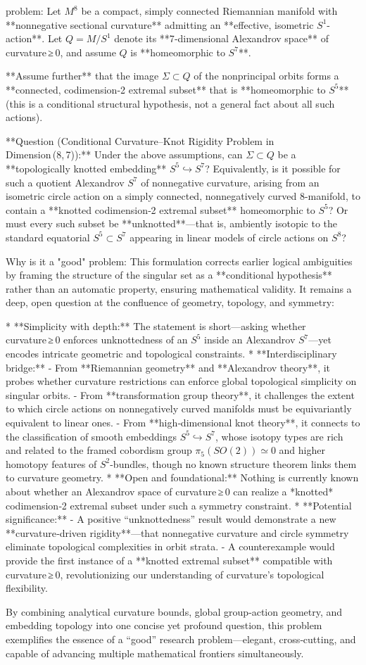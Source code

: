 problem:  
Let \( M^8 \) be a compact, simply connected Riemannian manifold with **nonnegative sectional curvature** admitting an **effective, isometric \( S^1 \)-action**.  
Let \( Q = M / S^1 \) denote its **7‑dimensional Alexandrov space** of curvature ≥ 0, and assume \( Q \) is **homeomorphic to \( S^7 \)**.  

**Assume further** that the image \( \Sigma \subset Q \) of the nonprincipal orbits forms a **connected, codimension‑2 extremal subset** that is **homeomorphic to \( S^5 \)** (this is a conditional structural hypothesis, not a general fact about all such actions).

**Question (Conditional Curvature–Knot Rigidity Problem in Dimension (8, 7)):**  
Under the above assumptions, can \( \Sigma \subset Q \) be a **topologically knotted embedding** \( S^5 \hookrightarrow S^7 \)?  
Equivalently, is it possible for such a quotient Alexandrov \( S^7 \) of nonnegative curvature, arising from an isometric circle action on a simply connected, nonnegatively curved \( 8 \)-manifold, to contain a **knotted codimension‑2 extremal subset** homeomorphic to \( S^5 \)?  
Or must every such subset be **unknotted**—that is, ambiently isotopic to the standard equatorial \( S^5 \subset S^7 \) appearing in linear models of circle actions on \( S^8 \)?  

Why is it a "good" problem:  
This formulation corrects earlier logical ambiguities by framing the structure of the singular set as a **conditional hypothesis** rather than an automatic property, ensuring mathematical validity. It remains a deep, open question at the confluence of geometry, topology, and symmetry:

* **Simplicity with depth:**  The statement is short—asking whether curvature ≥ 0 enforces unknottedness of an \( S^5 \) inside an Alexandrov \( S^7 \)—yet encodes intricate geometric and topological constraints.  
* **Interdisciplinary bridge:**  
  - From **Riemannian geometry** and **Alexandrov theory**, it probes whether curvature restrictions can enforce global topological simplicity on singular orbits.  
  - From **transformation group theory**, it challenges the extent to which circle actions on nonnegatively curved manifolds must be equivariantly equivalent to linear ones.  
  - From **high‑dimensional knot theory**, it connects to the classification of smooth embeddings \( S^5 \hookrightarrow S^7 \), whose isotopy types are rich and related to the framed cobordism group \( \pi_5(SO(2)) \simeq 0 \) and higher homotopy features of \(S^2\)-bundles, though no known structure theorem links them to curvature geometry.  
* **Open and foundational:**  Nothing is currently known about whether an Alexandrov space of curvature ≥ 0 can realize a *knotted* codimension‑2 extremal subset under such a symmetry constraint.  
* **Potential significance:**  
  - A positive “unknottedness” result would demonstrate a new **curvature‑driven rigidity**—that nonnegative curvature and circle symmetry eliminate topological complexities in orbit strata.  
  - A counterexample would provide the first instance of a **knotted extremal subset** compatible with curvature ≥ 0, revolutionizing our understanding of curvature’s topological flexibility.  

By combining analytical curvature bounds, global group‑action geometry, and embedding topology into one concise yet profound question, this problem exemplifies the essence of a “good” research problem—elegant, cross‑cutting, and capable of advancing multiple mathematical frontiers simultaneously.